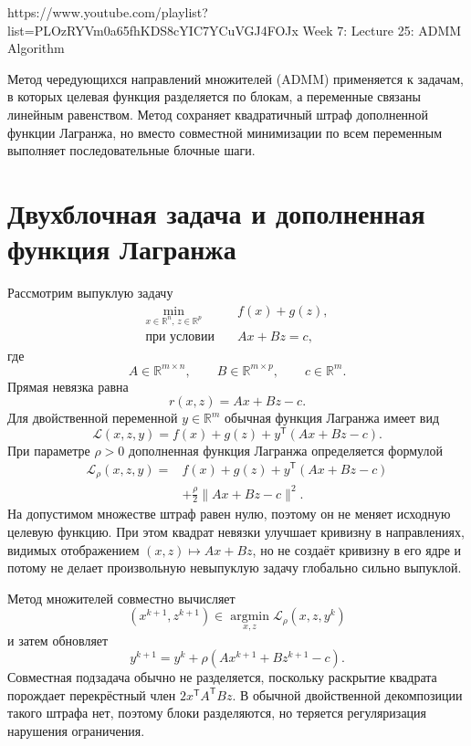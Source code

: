 
\sourcevideo
    {https://www.youtube.com/playlist?list=PLOzRYVm0a65fhKDS8cYIC7YCuVGJ4FOJx}
    {Week 7: Lecture 25: ADMM Algorithm}

Метод чередующихся направлений множителей (ADMM) применяется к
задачам, в которых целевая функция разделяется по блокам, а переменные
связаны линейным равенством. Метод сохраняет квадратичный штраф
дополненной функции Лагранжа, но вместо совместной минимизации по всем
переменным выполняет последовательные блочные шаги.

\section{Двухблочная задача и дополненная функция Лагранжа}

Рассмотрим выпуклую задачу
\[
\begin{aligned}
    \min_{x\in\mathbb R^n,\,z\in\mathbb R^p}\quad
    &f(x)+g(z),
    \\
    \text{при условии}\quad
    &Ax+Bz=c,
\end{aligned}
\]
где
\[
    A\in\mathbb R^{m\times n},
    \qquad
    B\in\mathbb R^{m\times p},
    \qquad
    c\in\mathbb R^m.
\]
Прямая невязка равна
\[
    r(x,z)=Ax+Bz-c.
\]
Для двойственной переменной \(y\in\mathbb R^m\) обычная функция
Лагранжа имеет вид
\[
    \mathcal L(x,z,y)
    =
    f(x)+g(z)+y^{\mathsf T}(Ax+Bz-c).
\]
При параметре \(\rho>0\) дополненная функция Лагранжа определяется
формулой
\[
\begin{aligned}
    \mathcal L_\rho(x,z,y)
    ={}&
    f(x)+g(z)+y^{\mathsf T}(Ax+Bz-c)
    \\
    &+
    \frac{\rho}{2}\lVert Ax+Bz-c\rVert^2.
\end{aligned}
\]
На допустимом множестве штраф равен нулю, поэтому он не меняет
исходную целевую функцию. При этом квадрат невязки улучшает кривизну
в направлениях, видимых отображением
\((x,z)\mapsto Ax+Bz\), но не создаёт кривизну в его ядре и потому не
делает произвольную невыпуклую задачу глобально сильно выпуклой.

Метод множителей совместно вычисляет
\[
    (x^{k+1},z^{k+1})
    \in
    \operatorname*{argmin}_{x,z}
    \mathcal L_\rho(x,z,y^k)
\]
и затем обновляет
\[
    y^{k+1}
    =
    y^k+\rho(Ax^{k+1}+Bz^{k+1}-c).
\]
Совместная подзадача обычно не разделяется, поскольку раскрытие
квадрата порождает перекрёстный член
\(2x^{\mathsf T}A^{\mathsf T}Bz\). В обычной двойственной
декомпозиции такого штрафа нет, поэтому блоки разделяются, но
теряется регуляризация нарушения ограничения.

